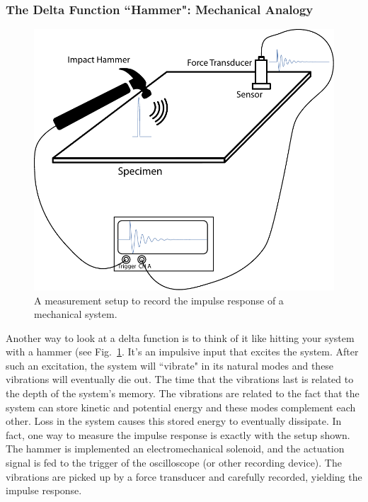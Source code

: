 \subsubsection{The Delta Function ``Hammer":  Mechanical Analogy}
\begin{figure}[tb]
\begin{center}
\includegraphics[width=.5\columnwidth]{hammer_resonance}
\end{center}
\caption{A measurement setup to record the impulse response of a mechanical system. }
\label{fig:hammer_setup}
\end{figure}
Another way to look at a delta function is to think of it like hitting your system with a hammer (see Fig.~\ref{fig:hammer_setup}.  It's an impulsive input that excites the system.  After such an excitation, the system will ``vibrate" in its natural modes and these vibrations will eventually die out.  The time that the vibrations last is related to the depth of the system's memory.  The vibrations are related to the fact that the system can store kinetic and potential energy and these modes complement each other.  Loss in the system causes this stored energy to eventually dissipate.  In fact, one way to measure the impulse response is exactly with the setup shown.  The hammer is implemented an electromechanical solenoid, and the actuation signal is fed to the trigger of the oscilloscope (or other recording device).  The vibrations are picked up by a force transducer and carefully recorded, yielding the impulse response.     
